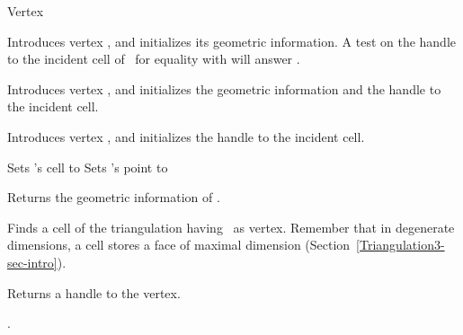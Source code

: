 \begin{ccRefClass}{Vertex}
\begin{ccAdvanced}
{Introduces vertex \ccVar, and initializes its geometric information.
A test on the handle
to the incident cell of \ccVar\ for equality with  will
answer .}

{Introduces vertex \ccVar, and initializes the geometric information and 
the handle to the incident cell.}

{Introduces vertex \ccVar, and initializes the handle to the incident cell.}


\ccOperations

{Sets \ccVar's cell to }
{Sets \ccVar's point to }

\end{ccAdvanced}

\ccAccessFunctions

{Returns the geometric information of \ccVar.}

{Finds a cell of the triangulation having \ccVar\ as
vertex. Remember that in degenerate dimensions, a cell stores a face
of maximal dimension (Section~\ref{Triangulation3-sec-intro}).}

{Returns a handle to the vertex.}



\ccSeeAlso

.

\end{ccRefClass}


